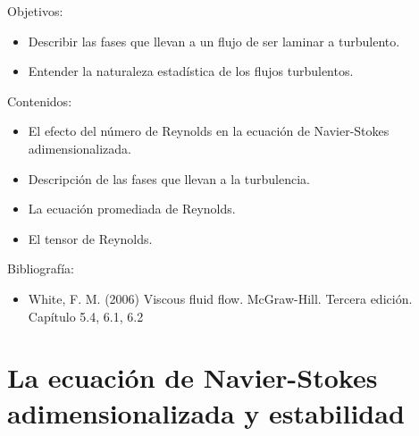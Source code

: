 \begin{framed}

Objetivos:
\begin{itemize}
    \item Describir las fases que llevan a un flujo de ser laminar a turbulento.
    \item Entender la naturaleza estadística de los flujos turbulentos.
\end{itemize}

Contenidos:
\begin{itemize}
    \item El efecto del número de Reynolds en la ecuación de Navier-Stokes adimensionalizada.
    \item Descripción de las fases que llevan a la turbulencia.
    \item La ecuación promediada de Reynolds.
    \item El tensor de Reynolds.
\end{itemize}

Bibliografía:
\begin{itemize}
    \item White, F. M. (2006) Viscous fluid flow. McGraw-Hill. Tercera edición. Capítulo 5.4, 6.1, 6.2
\end{itemize}
\end{framed}

\section*{La ecuación de Navier-Stokes adimensionalizada y estabilidad}

